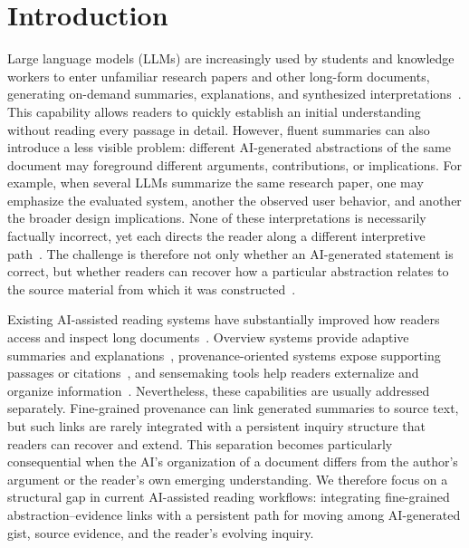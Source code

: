 \documentclass[manuscript,review,anonymous]{acmart}
\begin{document}



\section{Introduction}

Large language models (LLMs) are increasingly used by students and knowledge workers to enter unfamiliar research papers and other long-form documents, generating on-demand summaries, explanations, and synthesized interpretations~\cite{semantic_reader,qlarify,concepteva,realitysummary}. This capability allows readers to quickly establish an initial understanding without reading every passage in detail. However, fluent summaries can also introduce a less visible problem: different AI-generated abstractions of the same document may foreground different arguments, contributions, or implications. For example, when several LLMs summarize the same research paper, one may emphasize the evaluated system, another the observed user behavior, and another the broader design implications. None of these interpretations is necessarily factually incorrect, yet each directs the reader along a different interpretive path~\cite{tversky1981framing,pastorino2025framing,alessa2025quantifying}. The challenge is therefore not only whether an AI-generated statement is correct, but whether readers can recover how a particular abstraction relates to the source material from which it was constructed~\cite{papertrail,kambhamettu2024traceabletextdeepeningreading}.

Existing AI-assisted reading systems have substantially improved how readers access and inspect long documents~\cite{semantic_reader,scholarphi,paper_plain}. Overview systems provide adaptive summaries and explanations~\cite{qlarify,concepteva,abstractexplorer}, provenance-oriented systems expose supporting passages or citations~\cite{papertrail,tabletale,kambhamettu2024traceabletextdeepeningreading}, and sensemaking tools help readers externalize and organize information~\cite{liquidtext,sensecape,pirolli2005sensemaking}. Nevertheless, these capabilities are usually addressed separately. Fine-grained provenance can link generated summaries to source text, but such links are rarely integrated with a persistent inquiry structure that readers can recover and extend. This separation becomes particularly consequential when the AI's organization of a document differs from the author's argument or the reader's own emerging understanding. We therefore focus on a structural gap in current AI-assisted reading workflows: integrating fine-grained abstraction--evidence links with a persistent path for moving among AI-generated gist, source evidence, and the reader's evolving inquiry.
\end{document}
